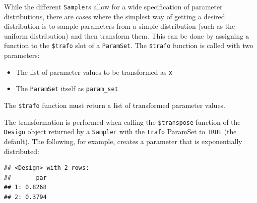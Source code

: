 \documentclass[]{article}
\newenvironment{Shaded}{\begin{snugshade}}{\end{snugshade}}
\newcommand{\CommentTok}[1]{\textcolor[rgb]{0.56,0.35,0.01}{\textit{#1}}}
\newcommand{\ControlFlowTok}[1]{\textcolor[rgb]{0.13,0.29,0.53}{\textbf{#1}}}
\newcommand{\DecValTok}[1]{\textcolor[rgb]{0.00,0.00,0.81}{#1}}
\newcommand{\KeywordTok}[1]{\textcolor[rgb]{0.13,0.29,0.53}{\textbf{#1}}}
\newcommand{\NormalTok}[1]{#1}
\newcommand{\OperatorTok}[1]{\textcolor[rgb]{0.81,0.36,0.00}{\textbf{#1}}}
\newcommand{\StringTok}[1]{\textcolor[rgb]{0.31,0.60,0.02}{#1}}
\providecommand{\tightlist}{%
  \setlength{\itemsep}{0pt}\setlength{\parskip}{0pt}}
\renewenvironment{Shaded} {\begin{snugshade}\small} {\end{snugshade}}
\begin{document}
While the different \texttt{Sampler}s allow for a wide specification of parameter distributions, there are cases where the simplest way of getting a desired distribution is to sample parameters from a simple distribution (such as the uniform distribution) and then transform them.
This can be done by assigning a function to the \texttt{\$trafo} slot of a \texttt{ParamSet}.
The \texttt{\$trafo} function is called with two parameters:

\begin{itemize}
\tightlist
\item
  The list of parameter values to be transformed as \texttt{x}
\item
  The \texttt{ParamSet} itself as \texttt{param\_set}
\end{itemize}

The \texttt{\$trafo} function must return a list of transformed parameter values.

The transformation is performed when calling the \texttt{\$transpose} function of the \texttt{Design} object returned by a \texttt{Sampler} with the \texttt{trafo} ParamSet to \texttt{TRUE} (the default).
The following, for example, creates a parameter that is exponentially distributed:

\begin{Shaded}
\end{Shaded}

\begin{verbatim}
## <Design> with 2 rows:
##       par
## 1: 0.8268
## 2: 0.3794
\end{verbatim}

\begin{Shaded}
\end{Shaded}
\end{document}
